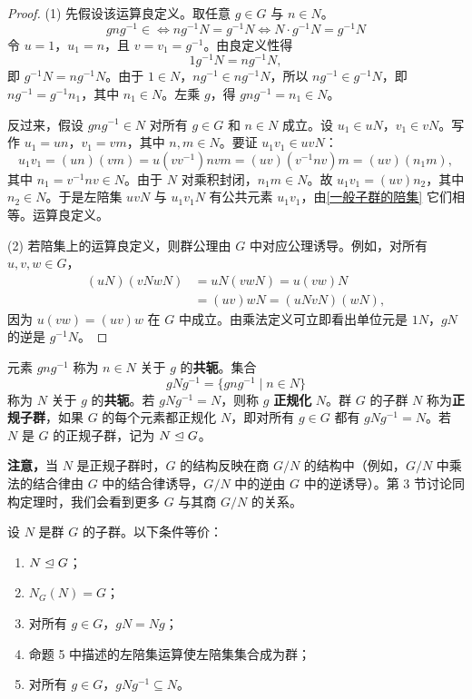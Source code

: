 \begin{proof}
	(1) 先假设该运算良定义。取任意 $g\in G$ 与 $n\in N$。
	\[gng^{-1}\in \iff ng^{-1}N=g^{-1}N\iff N\cdot g^{-1}N=g^{-1}N\]
	令 $u=1$，$u_1=n$，且 $v=v_1=g^{-1}$。由良定义性得
	\[
	1g^{-1}N=ng^{-1}N,
	\]
	即 $g^{-1}N=ng^{-1}N$。由于 $1\in N$，$ng^{-1}\in ng^{-1}N$，所以 $ng^{-1}\in g^{-1}N$，即 $ng^{-1}=g^{-1}n_1$，其中 $n_1\in N$。左乘 $g$，得 $gng^{-1}=n_1\in N$。
	
	反过来，假设 $gng^{-1}\in N$ 对所有 $g\in G$ 和 $n\in N$ 成立。设 $u_1\in uN$，$v_1\in vN$。写作 $u_1=un$，$v_1=vm$，其中 $n,m\in N$。要证 $u_1v_1\in uvN$：
	\[
	u_1v_1=(un)(vm)=u(vv^{-1})nvm=(uv)(v^{-1}nv)m=(uv)(n_1m),
	\]
	其中 $n_1=v^{-1}nv\in N$。由于 $N$ 对乘积封闭，$n_1m\in N$。故 $u_1v_1=(uv)n_2$，其中 $n_2\in N$。于是左陪集 $uvN$ 与 $u_1v_1N$ 有公共元素 $u_1v_1$，由\ref{一般子群的陪集} 它们相等。运算良定义。
	
	(2) 若陪集上的运算良定义，则群公理由 $G$ 中对应公理诱导。例如，对所有 $u,v,w\in G$，
	\begin{align*}
		(uN)(vNwN)&=uN(vwN)=u(vw)N\\
		&=(uv)wN=(uNvN)(wN),
	\end{align*}
	因为 $u(vw)=(uv)w$ 在 $G$ 中成立。由乘法定义可立即看出单位元是 $1N$，$gN$ 的逆是 $g^{-1}N$。
\end{proof}



\begin{definition}
	 元素 $gng^{-1}$ 称为 $n\in N$ 关于 $g$ 的\textbf{共轭}。集合
\[
gNg^{-1}=\{gng^{-1}\mid n\in N\}
\]
称为 $N$ 关于 $g$ 的\textbf{共轭}。若 $gNg^{-1}=N$，则称 $g$ \textbf{正规化} $N$。群 $G$ 的子群 $N$ 称为\textbf{正规子群}，如果 $G$ 的每个元素都正规化 $N$，即对所有 $g\in G$ 都有 $gNg^{-1}=N$。若 $N$ 是 $G$ 的正规子群，记为 $N\trianglelefteq G$。

\end{definition}
\textbf{注意，}当 $N$ 是正规子群时，$G$ 的结构反映在商 $G/N$ 的结构中（例如，$G/N$ 中乘法的结合律由 $G$ 中的结合律诱导，$G/N$ 中的逆由 $G$ 中的逆诱导）。第 3 节讨论同构定理时，我们会看到更多 $G$ 与其商 $G/N$ 的关系。

\begin{theorem}
	设 $N$ 是群 $G$ 的子群。以下条件等价：
\begin{enumerate}[label=(\arabic*)]
	\item $N\trianglelefteq G$；
	\item $N_G(N)=G$；
	\item 对所有 $g\in G$，$gN=Ng$；
	\item 命题 5 中描述的左陪集运算使左陪集集合成为群；
	\item 对所有 $g\in G$，$gNg^{-1}\subseteq N$。
\end{enumerate}

\end{theorem}


















